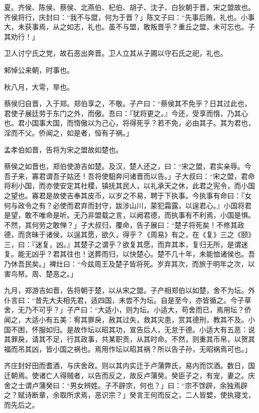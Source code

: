 \documentclass[]{article}
\begin{document}
夏。齐侯、陈侯、蔡侯、北燕伯、杞伯、胡子、沈子、白狄朝于晋，宋之盟故也。齐侯将行，庆封曰：``我不与盟，何为于晋？」陈文子曰：``先事后贿，礼也。小事大，未获事焉，从之如志，礼也。虽不与盟，敢叛晋乎？重丘之盟，未可忘也。子其劝行！」

卫人讨宁氏之党，故石恶出奔晋。卫人立其从子圃以守石氏之祀，礼也。

邾悼公来朝，时事也。

秋八月，大雩，旱也。

蔡侯归自晋，入于郑。郑伯享之，不敬。子产曰：``蔡侯其不免乎？日其过此也，君使子展廷劳于东门之外，而傲。吾曰：『犹将更之。』今还，受享而惰，乃其心也。君小国事大国，而惰傲以为己心，将得死乎？若不免，必由其子。其为君也，淫而不父。侨闻之，如是者，恒有子祸。」

孟孝伯如晋，告将为宋之盟故如楚也。

蔡侯之如晋也，郑伯使游吉如楚。及汉，楚人还之，曰：``宋之盟，君实亲辱。今吾子来，寡君谓吾子姑还！吾将使馹奔问诸晋而以告。」子大叔曰：``宋之盟，君命将利小国，而亦使安定其社稷，镇抚其民人，以礼承天之休，此君之宪令，而小国之望也。寡君是故使吉奉其皮币，以岁之不易，聘于下执事。今执事有命曰：『女何与政令之有？必使而君弃而封守，跋涉山川，蒙犯霜露，以逞君心。』小国将君是望，敢不唯命是听。无乃非盟载之言，以阙君德，而执事有不利焉，小国是惧。不然，其何劳之敢惮？」子大叔归，覆命，告子展曰：``楚子将死矣！不修其政德，而贪昧于诸侯，以逞其愿，欲久，得乎？《周易》有之，在《复》三之《颐》三，曰：『迷复，凶。』其楚子之谓乎？欲复其愿，而弃其本，复归无所，是谓迷复。能无凶乎？君其往也！送葬而归，以快楚心。楚不几十年，未能恤诸侯也。吾乃休吾民矣。」裨灶曰：``今兹周王及楚子皆将死。岁弃其次，而旅于明年之次，以害鸟帑。周、楚恶之。」

九月，郑游吉如晋，告将朝于楚，以从宋之盟。子产相郑伯以如楚，舍不为坛。外仆言曰：``昔先大夫相先君，适四国，未尝不为坛。自是至今，亦皆循之。今子草舍，无乃不可乎？」子产曰：``大适小，则为坛。小适大，苟舍而已，焉用坛？侨闻之，大适小有五美：宥其罪戾，赦其过失，救其灾患，赏其德刑，教其不及。小国不困，怀服如归。是故作坛以昭其功，宣告后人，无怠于德。小适大有五恶：说其罪戾，请其不足，行其政事，共某职贡，从其时命。不然，则重其币帛，以贺其福而吊其凶，皆小国之祸也。焉用作坛以昭其祸？所以告子孙，无昭祸焉可也。」

齐庄封好田而耆酒，与庆舍政。则以其内实迁于卢蒲弊氏，易内而饮酒。数日，国迁朝焉。使诸亡人得贼者，以告而反之，故反卢蒲癸。癸臣子之，有宠，妻之。庆舍之士谓卢蒲癸曰：``男女辨姓。子不辟宗，何也？」曰：``宗不馀辟，余独焉辟之？赋诗断章，余取所求焉，恶识宗？」癸言王何而反之，二人皆嬖，使执寝戈，而先后之。
\end{document}
